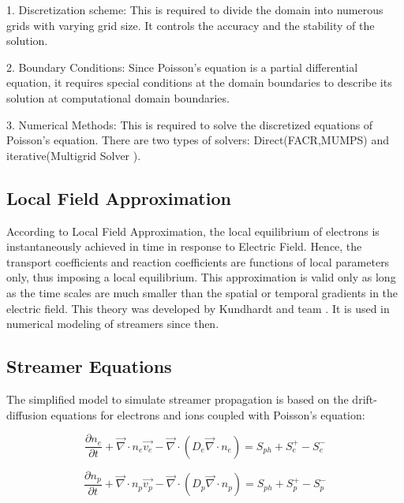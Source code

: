 \documentclass{article}
\begin{document}
   1. Discretization scheme: This is required to divide the domain into numerous grids with varying grid size. It controls the accuracy and the stability of the solution.
   
   2. Boundary Conditions: Since Poisson's equation is a partial differential equation, it requires special conditions at the domain boundaries to describe its solution at computational domain boundaries.
   
   3. Numerical Methods: This is required to solve the discretized equations of Poisson's equation. There are two types of solvers: Direct(FACR\cite{Swarztrauber1979AlgorithmD3},MUMPS\cite{Amestoy2001AScheduling}) and iterative(Multigrid Solver \cite{Adams1989Mudpack:Equations}). 


\subsection{Local Field Approximation}

According to Local Field Approximation, the local equilibrium of electrons is instantaneously achieved in time in response to Electric Field. Hence, the transport coefficients and reaction coefficients are functions of local parameters only, thus imposing a local equilibrium. This approximation is valid only as long as the time scales are much smaller than the spatial or temporal gradients in the electric field. This theory was developed by Kundhardt and team \cite{Kunhardt1988DevelopmentStreamers}. It is used in numerical modeling of streamers since then.

\subsection{Streamer Equations}
The simplified model to simulate streamer propagation is based on the drift-diffusion equations for electrons and ions coupled with Poisson's equation:

\begin{equation}
\frac{\partial n_e}{\partial t} + \vec{\nabla} \cdot n_e \vec{v_e} -\vec{\nabla} \cdot (D_e \vec{\nabla} \cdot n_e) = S_{ph} + S_e^+ - S_e^- 
\end{equation}

\begin{equation}
\frac{\partial n_p}{\partial t} + \vec{\nabla} \cdot n_p \vec{v_p} -\vec{\nabla} \cdot (D_p \vec{\nabla} \cdot n_p) = S_{ph} + S_p^+ - S_p^- 
\end{equation}
\end{document}
